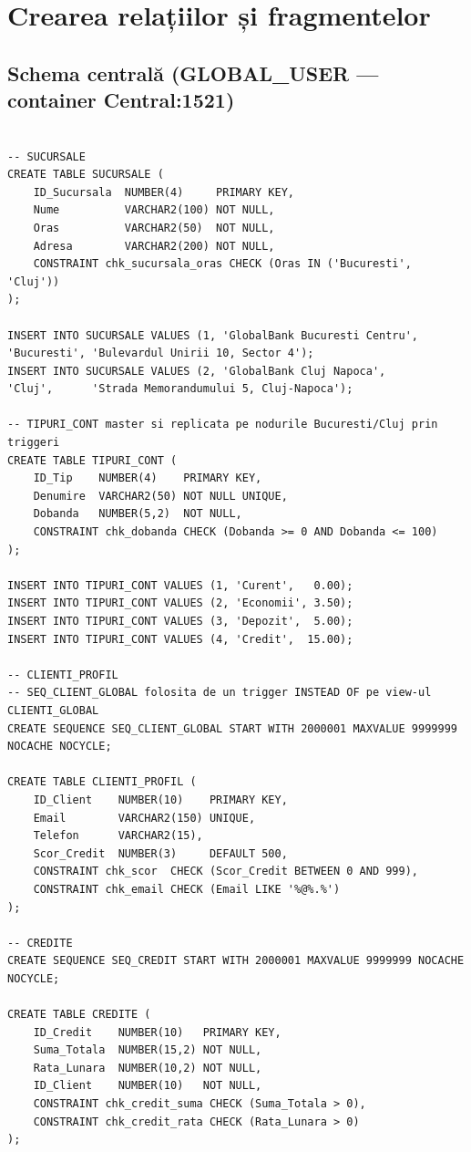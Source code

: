 \documentclass[12pt,a4paper]{article}
\begin{document}
\section{Crearea relațiilor și fragmentelor}

\subsection{Schema centrală (GLOBAL\_USER — container Central:1521)}
\begin{lstlisting}

-- SUCURSALE
CREATE TABLE SUCURSALE (
    ID_Sucursala  NUMBER(4)     PRIMARY KEY,
    Nume          VARCHAR2(100) NOT NULL,
    Oras          VARCHAR2(50)  NOT NULL,
    Adresa        VARCHAR2(200) NOT NULL,
    CONSTRAINT chk_sucursala_oras CHECK (Oras IN ('Bucuresti', 'Cluj'))
);

INSERT INTO SUCURSALE VALUES (1, 'GlobalBank Bucuresti Centru', 'Bucuresti', 'Bulevardul Unirii 10, Sector 4');
INSERT INTO SUCURSALE VALUES (2, 'GlobalBank Cluj Napoca',      'Cluj',      'Strada Memorandumului 5, Cluj-Napoca');

-- TIPURI_CONT master si replicata pe nodurile Bucuresti/Cluj prin triggeri
CREATE TABLE TIPURI_CONT (
    ID_Tip    NUMBER(4)    PRIMARY KEY,
    Denumire  VARCHAR2(50) NOT NULL UNIQUE,
    Dobanda   NUMBER(5,2)  NOT NULL,
    CONSTRAINT chk_dobanda CHECK (Dobanda >= 0 AND Dobanda <= 100)
);

INSERT INTO TIPURI_CONT VALUES (1, 'Curent',   0.00);
INSERT INTO TIPURI_CONT VALUES (2, 'Economii', 3.50);
INSERT INTO TIPURI_CONT VALUES (3, 'Depozit',  5.00);
INSERT INTO TIPURI_CONT VALUES (4, 'Credit',  15.00);

-- CLIENTI_PROFIL
-- SEQ_CLIENT_GLOBAL folosita de un trigger INSTEAD OF pe view-ul CLIENTI_GLOBAL
CREATE SEQUENCE SEQ_CLIENT_GLOBAL START WITH 2000001 MAXVALUE 9999999 NOCACHE NOCYCLE;

CREATE TABLE CLIENTI_PROFIL (
    ID_Client    NUMBER(10)    PRIMARY KEY,
    Email        VARCHAR2(150) UNIQUE,
    Telefon      VARCHAR2(15),
    Scor_Credit  NUMBER(3)     DEFAULT 500,
    CONSTRAINT chk_scor  CHECK (Scor_Credit BETWEEN 0 AND 999),
    CONSTRAINT chk_email CHECK (Email LIKE '%@%.%')
);

-- CREDITE
CREATE SEQUENCE SEQ_CREDIT START WITH 2000001 MAXVALUE 9999999 NOCACHE NOCYCLE;

CREATE TABLE CREDITE (
    ID_Credit    NUMBER(10)   PRIMARY KEY,
    Suma_Totala  NUMBER(15,2) NOT NULL,
    Rata_Lunara  NUMBER(10,2) NOT NULL,
    ID_Client    NUMBER(10)   NOT NULL,
    CONSTRAINT chk_credit_suma CHECK (Suma_Totala > 0),
    CONSTRAINT chk_credit_rata CHECK (Rata_Lunara > 0)
);


\end{lstlisting}
\end{document}
